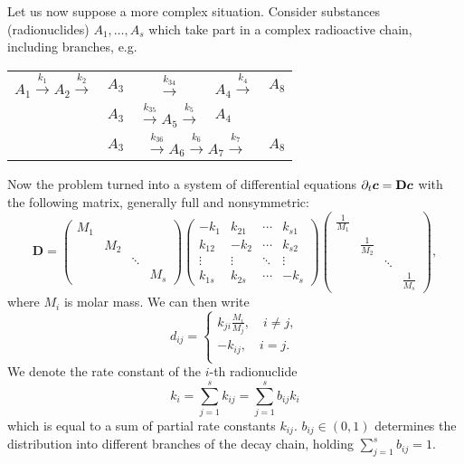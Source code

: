 Let us now suppose a more complex situation. Consider substances (radionuclides) $A_1,\ldots, A_s$ which take 
part in a complex radioactive chain, including branches, e.g.
\begin{center}
\begin{tabular}{rccll}
 $A_1\xrightarrow{k_1}A_2\xrightarrow{k_2}$ & $A_3$ & $ \xrightarrow{k_{34}}$ & $A_4\xrightarrow{k_4}$ & $A_8$ \\
 & $A_3$ & $\xrightarrow{k_{35}} A_5 \xrightarrow{k_{5}}$ & $A_4$ &\\
 & $A_3$ & \multicolumn{2}{c}{$\xrightarrow{k_{36}} A_6 \xrightarrow{k_{6}} A_7 \xrightarrow{k_{7}}$} & $A_8$
\end{tabular}
\end{center}
Now the problem turned into a system of differential equations $\partial_t \mathbf{\boldsymbol{c}}=\mathbf{D}\mathbf{\boldsymbol{c}}$ with the following
matrix, generally full and nonsymmetric:
\[
\mathbf{D} = \begin{pmatrix} M_1 &     && \\ 
                                 & M_2 && \\
                                 && \ddots & \\
                  && & M_s \end{pmatrix}
             \begin{pmatrix} -k_1 &k_{21}& \cdots & k_{s1} \\ 
                  k_{12} & -k_2 & \cdots & k_{s2} \\
                  \vdots &\vdots& \ddots & \vdots \\
                  k_{1s} &k_{2s}& \cdots & -k_s \end{pmatrix}
             \begin{pmatrix} \frac{1}{M_1} &     && \\ 
                                 & \frac{1}{M_2} && \\
                                 && \ddots & \\
                  && & \frac{1}{M_s} \end{pmatrix},
\]
where $M_i$ is molar mass. We can then write
\begin{equation} \label{eqn:reaction_system_entries}
d_{ij} =
  \begin{cases}
  k_{ji} \frac{M_i}{M_j}, \quad i\neq j, \\
  -k_{ij}, \quad i=j. \\
  \end{cases}
\end{equation}
We denote the rate constant of the $i$-th radionuclide
\[
  k_i=\sum_{j=1}^{s}k_{ij}=\sum_{j=1}^{s}b_{ij}k_i
\]
which is equal to a sum of partial rate constants $k_{ij}$.  $b_{ij}\in(0,1)$ 
determines the distribution into different branches of the decay chain, holding $\sum_{j=1}^{s}b_{ij}=1$.

